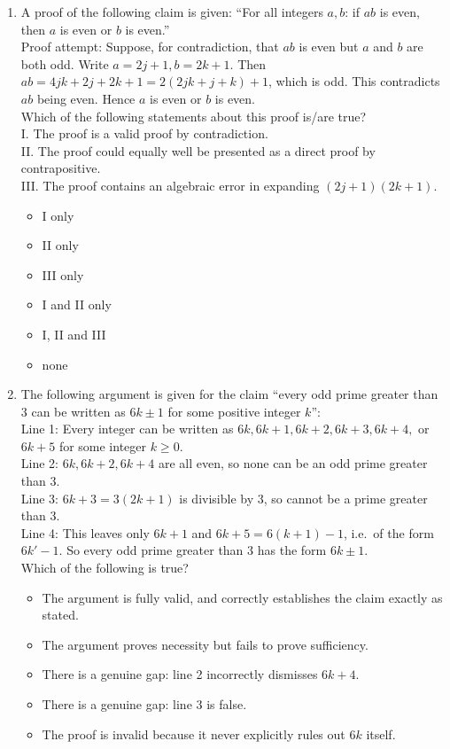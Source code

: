 \documentclass[11pt,a4paper]{article}
\begin{document}
\begin{enumerate}
\item A proof of the following claim is given: ``For all integers $a,b$: if $ab$ is even, then $a$ is even or $b$ is even.''\\
Proof attempt: Suppose, for contradiction, that $ab$ is even but $a$ and $b$ are both odd. Write $a=2j+1,b=2k+1$. Then $ab=4jk+2j+2k+1=2(2jk+j+k)+1$, which is odd. This contradicts $ab$ being even. Hence $a$ is even or $b$ is even.\\
Which of the following statements about this proof is/are true?\\
I. The proof is a valid proof by contradiction.\\
II. The proof could equally well be presented as a direct proof by contrapositive.\\
III. The proof contains an algebraic error in expanding $(2j+1)(2k+1)$.
\begin{itemize}
\item[A)] I only
\item[B)] II only
\item[C)] III only
\item[D)] I and II only
\item[E)] I, II and III
\item[F)] none
\end{itemize}

\item The following argument is given for the claim ``every odd prime greater than $3$ can be written as $6k\pm1$ for some positive integer $k$'':\\
Line 1: Every integer can be written as $6k,6k+1,6k+2,6k+3,6k+4,$ or $6k+5$ for some integer $k\geq0$.\\
Line 2: $6k,6k+2,6k+4$ are all even, so none can be an odd prime greater than $3$.\\
Line 3: $6k+3=3(2k+1)$ is divisible by $3$, so cannot be a prime greater than $3$.\\
Line 4: This leaves only $6k+1$ and $6k+5=6(k+1)-1$, i.e.\ of the form $6k'-1$. So every odd prime greater than $3$ has the form $6k\pm1$.\\
Which of the following is true?
\begin{itemize}
\item[A)] The argument is fully valid, and correctly establishes the claim exactly as stated.
\item[B)] The argument proves necessity but fails to prove sufficiency.
\item[C)] There is a genuine gap: line 2 incorrectly dismisses $6k+4$.
\item[D)] There is a genuine gap: line 3 is false.
\item[E)] The proof is invalid because it never explicitly rules out $6k$ itself.
\end{itemize}


\end{enumerate}
\end{document}
